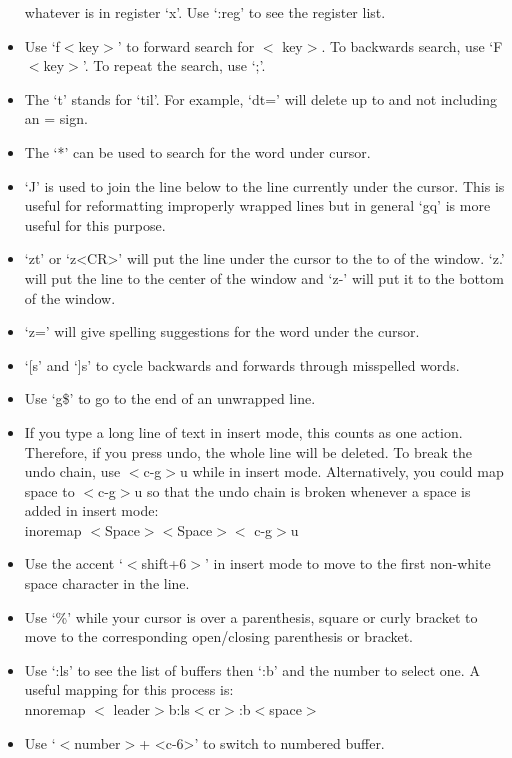 \documentclass[10pt]{article}
\newcommand{\tlangle}{$<$}
\newcommand{\trangle}{$>$}
\begin{document}
\begin{itemize}
        whatever is in register `x'.  Use `:reg' to see the register list.
    \item Use `f\tlangle key\trangle' to forward search for \tlangle
        key\trangle. To backwards search, use `F\tlangle key\trangle'. To repeat
        the search, use `;'. 
    \item The `t' stands for `til'. For example, `dt=' will delete up to and not
        including an = sign.  \item The `*' can be used to search for the word
        under cursor.
    \item `J' is used to join the line below to the line currently under the
        cursor. This is useful for reformatting improperly wrapped lines but in
        general `gq' is more useful for this purpose.
    \item `zt' or `z<CR>' will put the line under the cursor to the to of the
        window. `z.' will put the line to the center of the window and `z-' will
        put it to the bottom of the window.
    \item `z=' will give spelling suggestions for the word under the cursor.
    \item `[s' and `]s' to cycle backwards and forwards through misspelled words.
    \item Use `g\$' to go to the end of an unwrapped line.
    \item If you type a long line of text in insert mode, this counts as one
        action. Therefore, if you press undo, the whole line will be deleted. To
        break the undo chain, use \tlangle c-g\trangle u while in insert mode.
        Alternatively, you could map space to \tlangle c-g\trangle u so that the
        undo chain is broken whenever a space is added in insert mode:\\
        inoremap \tlangle Space\trangle \tlangle Space\trangle \tlangle
        c-g\trangle u
    \item Use the accent `\tlangle shift+6\trangle' in insert mode to move to
        the first non-white space character in the line.
    \item Use `\%' while your cursor is over a parenthesis, square or curly
        bracket to move to the corresponding open/closing parenthesis or
        bracket.
    \item Use `:ls' to see the list of buffers then `:b' and the number to
        select one. A useful mapping for this process is:\\ nnoremap \tlangle
        leader\trangle b:ls\tlangle cr\trangle:b\tlangle space\trangle
    \item Use `\tlangle number\trangle + <c-6>' to switch to numbered buffer.
\end{itemize}
\end{document}
